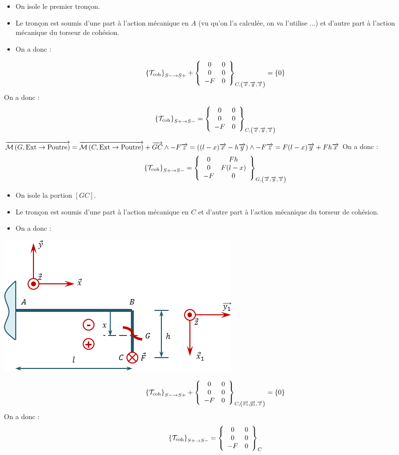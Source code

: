 \documentclass[10pt,fleqn]{article} %
\begin{document}
\begin{multicols}{2}
\begin{corrige}
\begin{itemize}[label=,font=\color{ocre}] 
\item On isole le premier tronçon.
\item Le tronçon est soumis d'une part à l'action mécanique en $A$ (vu qu'on l'a calculée, on va l'utilise ...) et d'autre part à l'action mécanique du torseur de cohésion.
\item On a donc :
\end{itemize}
$$
\torseurscoh_{S-\rightarrow S+} + \torseurcol{0}{0}{-F}{0}{0}{0}{C,\left( \vect{x},\vect{y},\vect{z} \right)} = \{0\}
$$
On a donc :
$$
\torseurscoh_{S+\rightarrow S-}
=\torseurcol{0}{0}{-F}{0}{0}{0}{C,\left( \vect{x},\vect{y},\vect{z} \right)}
$$

$\vectm{G}{\text{Ext}}{\text{Poutre}}
=\vectm{C}{\text{Ext}}{\text{Poutre}} + \vect{GC}\wedge -F \vect{z}  
= \left( (l-x) \vect{x} - h\vect{y} \right) \wedge -F \vect{z}
= F(l-x) \vect{y} +F h\vect{x} 
$
On a donc :
$$
\torseurscoh_{S+\rightarrow S-}
=\torseurcol{0}{0}{-F}{Fh}{F(l-x)}{0}{G,\left( \vect{x},\vect{y},\vect{z} \right)}
$$


\begin{minipage}[c]{.45\linewidth}
\begin{itemize}[label=,font=\color{ocre}] 
\item On isole la portion $[GC]$.
\item Le tronçon est soumis d'une part à l'action mécanique en $C$ et d'autre part à l'action mécanique du torseur de cohésion.
\item On a donc :
\end{itemize}
\end{minipage}\hfill
\begin{minipage}[c]{.45\linewidth}
\begin{center}
\includegraphics[width=.8\linewidth]{images/exo_02_corr_02}
\end{center}
\end{minipage}
$$
\torseurscoh_{S-\rightarrow S+} + \torseurcol{0}{0}{-F}{0}{0}{0}{C,\left( \vect{x_1},\vect{y_1},\vect{z} \right)} = \{0\}
$$
On a donc :
$$
\torseurscoh_{S+\rightarrow S-}
=\torseurcol{0}{0}{-F}{0}{0}{0}{C}
$$


\end{corrige}
\end{multicols}
\end{document}
